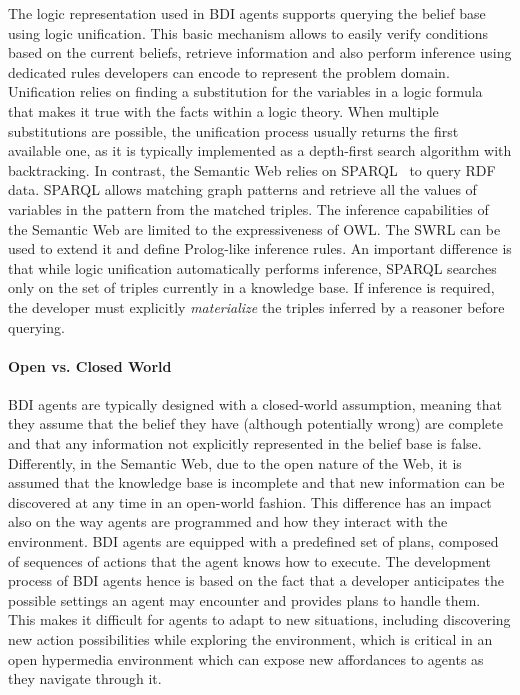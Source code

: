 \documentclass[
]{ceurart}
\begin{document}
The logic representation used in \ac{BDI} agents supports querying the belief base using logic unification.
%
This basic mechanism allows to easily verify conditions based on the current beliefs, retrieve information and also perform inference using dedicated rules developers can encode to represent the problem domain.
%
Unification relies on finding a substitution for the variables in a logic formula that makes it true with the facts within a logic theory. When multiple substitutions are possible, the unification process usually returns the first available one, as it is typically implemented as a depth-first search algorithm with backtracking.
%
In contrast, the Semantic Web relies on \acs{SPARQL}~\cite{sparqlprotocol} to query \ac{RDF} data.
\acs{SPARQL} allows matching graph patterns and retrieve all the values of variables in the pattern from the matched triples.
%
The inference capabilities of the Semantic Web are limited to the expressiveness of \ac{OWL}. The \ac{SWRL} can be used to extend it and define Prolog-like inference rules.
%
An important difference is that while logic unification automatically performs inference, \ac{SPARQL} searches only on the set of triples currently in a knowledge base. If inference is required, the developer must explicitly \emph{materialize} the triples inferred by a reasoner before querying.


\paragraph{Open vs. Closed World}

\ac{BDI} agents are typically designed with a closed-world assumption, meaning that they assume that the belief they have (although potentially wrong) are complete and that any information not explicitly represented in the belief base is false.
%
Differently, in the Semantic Web, due to the open nature of the Web, it is assumed that the knowledge base is incomplete and that new information can be discovered at any time in an open-world fashion.
%
This difference has an impact also on the way agents are programmed and how they interact with the environment.
%
\ac{BDI} agents are equipped with a predefined set of plans, composed of sequences of actions that the agent knows how to execute.
%
The development process of \ac{BDI} agents hence is based on the fact that a developer anticipates the possible settings an agent may encounter and provides plans to handle them.
%
This makes it difficult for agents to adapt to new situations,
including discovering new action possibilities while exploring the environment,
which is critical in an open hypermedia environment which can expose new affordances to agents as they navigate through it.
\end{document}
